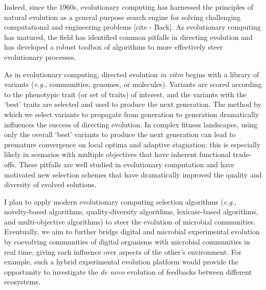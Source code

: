 Indeed, since the 1960s, evolutionary computing has harnessed the principles of natural evolution as a general purpose search engine for solving challenging computational and engineering problems [cite - Back]. 
As evolutionary computing has matured, the field has identified common pitfalls in directing evolution and has developed a robust toolbox of algorithms to more effectively steer evolutionary processes.

As in evolutionary computing, directed evolution \textit{in vitro} begins with a library of variants (\textit{e.g.}, communities, genomes, or molecules). 
Variants are scored according to the phenotypic trait (or set of traits) of interest, and the variants with the `best' traits are selected and used to produce the next generation.
The method by which we select variants to propagate from generation to generation dramatically influences the success of directing evolution. 
In complex fitness landscapes, using only the overall `best' variants to produce the next generation can lead to premature convergence on local optima and adaptive stagnation; 
this is especially likely in scenarios with multiple objectives that have inherent functional trade-offs.
These pitfalls are well studied in evolutionary computation and have motivated new selection schemes that have dramatically improved the quality and diversity of evolved solutions.

I plan to apply modern evolutionary computing selection algorithms (\textit{e.g.}, novelty-based algorithms, quality-diversity algorithms, lexicase-based algorithms, and multi-objective algorithms) to steer the evolution of microbial communities.
Eventually, we aim to further bridge digital and microbial experimental evolution by coevolving communities of digital organisms with microbial communities in real time, giving each influence over aspects of the other's environment.
For example, such a hybrid experimental evolution platform would provide the opportunity to investigate the \textit{de novo} evolution of feedbacks between different ecosystems.



